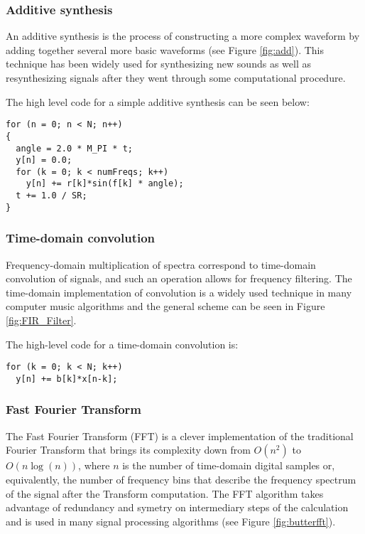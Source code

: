 \subsubsection{Additive synthesis}

An additive synthesis is the process of constructing a more complex waveform
by adding together several more basic waveforms (see Figure \ref{fig:add}).
This technique has been widely used for synthesizing new sounds as well as
resynthesizing signals after they went through some computational procedure.



The high level code for a simple additive synthesis can be seen below:

\begin{lstlisting}[caption=Additive synthesis algorithm.]
for (n = 0; n < N; n++)
{
  angle = 2.0 * M_PI * t;
  y[n] = 0.0;
  for (k = 0; k < numFreqs; k++)
    y[n] += r[k]*sin(f[k] * angle);
  t += 1.0 / SR;
}
\end{lstlisting}

\subsubsection{Time-domain convolution}

Frequency-domain multiplication of spectra correspond to time-domain
convolution of signals, and such an operation allows for frequency filtering.
The time-domain implementation of convolution is a widely used technique in
many computer music algorithms and the general scheme can be seen in Figure
\ref{fig:FIR_Filter}.


The high-level code for a time-domain convolution is:

\begin{lstlisting}
for (k = 0; k < N; k++)
  y[n] += b[k]*x[n-k];
\end{lstlisting}

\subsubsection{Fast Fourier Transform}

The Fast Fourier Transform (FFT) is a clever implementation of the traditional
Fourier Transform that brings its complexity down from $O(n^2)$ to
$O(n\log(n))$, where $n$ is the number of time-domain digital samples or,
equivalently, the number of frequency bins that describe the frequency
spectrum of the signal after the Transform computation. The FFT algorithm
takes advantage of redundancy and symetry on intermediary steps of the
calculation and is used in many signal processing algorithms (see Figure
\ref{fig:butterfft}).

